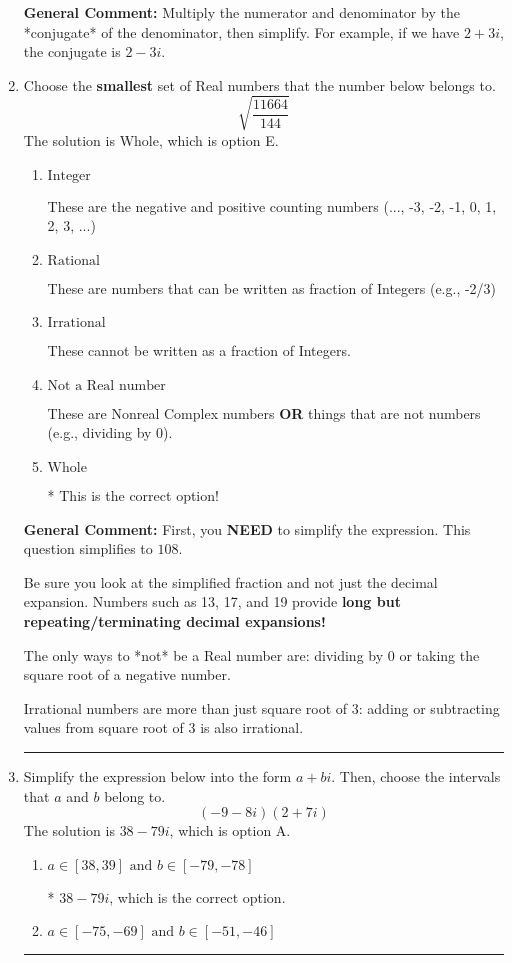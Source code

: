 \documentclass{extbook}[14pt]
\newcommand{\litem}[1]{\item #1

\rule{\textwidth}{0.4pt}}
\begin{document}
\begin{enumerate}
{\textbf{General Comment:} Multiply the numerator and denominator by the *conjugate* of the denominator, then simplify. For example, if we have $2+3i$, the conjugate is $2-3i$.
}
\litem{
Choose the \textbf{smallest} set of Real numbers that the number below belongs to.
\[ \sqrt{\frac{11664}{144}} \]The solution is \( \text{Whole} \), which is option E.\begin{enumerate}[label=\Alph*.]
\item \( \text{Integer} \)

These are the negative and positive counting numbers (..., -3, -2, -1, 0, 1, 2, 3, ...)
\item \( \text{Rational} \)

These are numbers that can be written as fraction of Integers (e.g., -2/3)
\item \( \text{Irrational} \)

These cannot be written as a fraction of Integers.
\item \( \text{Not a Real number} \)

These are Nonreal Complex numbers \textbf{OR} things that are not numbers (e.g., dividing by 0).
\item \( \text{Whole} \)

* This is the correct option!
\end{enumerate}

\textbf{General Comment:} First, you \textbf{NEED} to simplify the expression. This question simplifies to $108$. 
 
 Be sure you look at the simplified fraction and not just the decimal expansion. Numbers such as 13, 17, and 19 provide \textbf{long but repeating/terminating decimal expansions!} 
 
 The only ways to *not* be a Real number are: dividing by 0 or taking the square root of a negative number. 
 
 Irrational numbers are more than just square root of 3: adding or subtracting values from square root of 3 is also irrational.
}
\litem{
Simplify the expression below into the form $a+bi$. Then, choose the intervals that $a$ and $b$ belong to.
\[ (-9 - 8 i)(2 + 7 i) \]The solution is \( 38 - 79 i \), which is option A.\begin{enumerate}[label=\Alph*.]
\item \( a \in [38, 39] \text{ and } b \in [-79, -78] \)

* $38 - 79 i$, which is the correct option.
\item \( a \in [-75, -69] \text{ and } b \in [-51, -46] \)


\end{enumerate}}
\end{enumerate}
\end{document}
